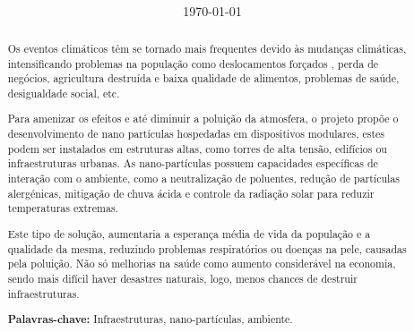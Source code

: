 \documentclass[a4paper, 11pt, onecolumn, oneside]{report}
\begin{document}
\title{%
{\Huge\textbf{\titulo}}\\
{\Large \empresa}
}
%
\author{%
    \autores \\ \\ 
    \departamento \\ \\
    \autorescontactos
}
%
\date{\today}
%
\maketitle
{} %
\renewcommand{\contentsname}{Índice}
\tableofcontents
\begin{abstract}
\par
Os eventos climáticos têm se tornado mais frequentes devido às mudanças climáticas, intensificando problemas na população como deslocamentos forçados , perda de negócios, agricultura destruída e baixa qualidade de alimentos, problemas de saúde, desigualdade social, etc.
\par
Para amenizar os efeitos e até diminuir a poluição da atmosfera, o projeto propõe o desenvolvimento de nano partículas hospedadas em dispositivos modulares, estes podem ser instalados em estruturas altas, como torres de alta tensão, edifícios ou infraestruturas urbanas. As nano-partículas possuem capacidades específicas de interação com o ambiente, como a neutralização de poluentes, redução de partículas alergénicas, mitigação de chuva ácida e controle da radiação solar para reduzir temperaturas extremas.
\par
Este tipo de solução, aumentaria a esperança média de vida da população e a qualidade da mesma, reduzindo problemas respiratórios ou doenças na pele, causadas pela poluição. Não só melhorias na saúde como aumento considerável na economia, sendo mais difícil haver desastres naturais, logo, menos chances de destruir infraestruturas.
\par
\textbf{Palavras-chave:} Infraestruturas, nano-partículas, ambiente.
\end{abstract}

\listoffigures

\clearpage
{}

%
\end{document}
